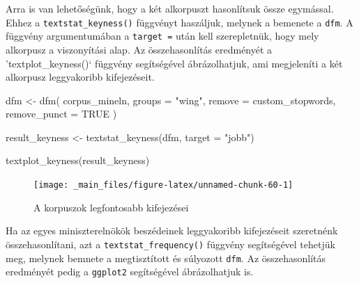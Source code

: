 \documentclass[
]{book}
\newenvironment{Shaded}{\begin{snugshade}}{\end{snugshade}}
\newcommand{\AttributeTok}[1]{\textcolor[rgb]{0.77,0.63,0.00}{#1}}
\newcommand{\ConstantTok}[1]{\textcolor[rgb]{0.00,0.00,0.00}{#1}}
\newcommand{\FunctionTok}[1]{\textcolor[rgb]{0.00,0.00,0.00}{#1}}
\newcommand{\NormalTok}[1]{#1}
\newcommand{\OtherTok}[1]{\textcolor[rgb]{0.56,0.35,0.01}{#1}}
\newcommand{\StringTok}[1]{\textcolor[rgb]{0.31,0.60,0.02}{#1}}
\begin{document}
Arra is van lehetőségünk, hogy a két alkorpuszt hasonlítsuk össze
egymással. Ehhez a \texttt{textstat\_keyness()} függvényt haszáljuk,
melynek a bemenete a \texttt{dfm}. A függvény argumentumában a
\texttt{target\ =} után kell szerepletnük, hogy mely alkorpusz a
viszonyítási alap. Az összehasonlítás eredményét a 'textplot\_keyness()`
függvény segítségével ábrázolhatjuk, ami megjeleníti a két alkorpusz
leggyakoribb kifejezéseit.

\begin{Shaded}
\begin{Highlighting}[]
\NormalTok{dfm }\OtherTok{\textless{}{-}} \FunctionTok{dfm}\NormalTok{(}
\NormalTok{  corpus\_mineln,}
  \AttributeTok{groups =} \StringTok{"wing"}\NormalTok{, }
  \AttributeTok{remove =}\NormalTok{ custom\_stopwords,}
  \AttributeTok{remove\_punct =} \ConstantTok{TRUE}
\NormalTok{)}

\NormalTok{result\_keyness }\OtherTok{\textless{}{-}} \FunctionTok{textstat\_keyness}\NormalTok{(dfm, }\AttributeTok{target =} \StringTok{"jobb"}\NormalTok{)}
\end{Highlighting}
\end{Shaded}

\begin{Shaded}
\begin{Highlighting}[]
\FunctionTok{textplot\_keyness}\NormalTok{(result\_keyness)}
\end{Highlighting}
\end{Shaded}

\begin{figure}

{\centering \texttt{[image: \_main\_files/figure-latex/unnamed-chunk-60-1]} 

}

\caption{A korpuszok legfontosabb kifejezései}\label{fig:unnamed-chunk-60}
\end{figure}

Ha az egyes miniszterelnökök beszédeinek leggyakoribb kifejezéseit
szeretnénk összehasonlítani, azt a \texttt{textstat\_frequency()}
függvény segítségével tehetjük meg, melynek bemnete a megtisztított és
súlyozott \texttt{dfm}. Az összehasonlítás eredményét pedig a
\texttt{ggplot2} segítségével ábrázolhatjuk is.
\end{document}
